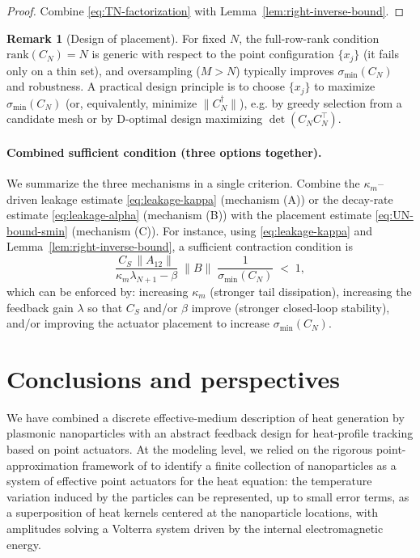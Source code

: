 \documentclass[11pt,a4paper]{article}
\numberwithin{equation}{section}
\theoremstyle{definition}
\newtheorem{remark}[theorem]{Remark}
\newcommand{\1}{\mathbbm{1}}
\begin{document}
\begin{proof}
Combine \eqref{eq:TN-factorization} with Lemma~\ref{lem:right-inverse-bound}.
\end{proof}

\begin{remark}[Design of placement]
For fixed $N$, the full-row-rank condition $\mathrm{rank}(C_N)=N$ is generic with respect to the point configuration
$\{x_j\}$ (it fails only on a thin set), and oversampling ($M>N$) typically improves $\sigma_{\min}(C_N)$ and robustness.
A practical design principle is to choose $\{x_j\}$ to maximize $\sigma_{\min}(C_N)$ (or, equivalently, minimize $\|C_N^\dagger\|$),
e.g. by greedy selection from a candidate mesh or by D-optimal design maximizing $\det(C_NC_N^\top)$.
\end{remark}

\paragraph{Combined sufficient condition (three options together).}
We summarize the three mechanisms in a single criterion. Combine the $\kappa_m$--driven leakage estimate
\eqref{eq:leakage-kappa} (mechanism (A)) or the decay-rate estimate \eqref{eq:leakage-alpha} (mechanism (B))
with the placement estimate \eqref{eq:UN-bound-smin} (mechanism (C)). For instance, using \eqref{eq:leakage-kappa} and
Lemma~\ref{lem:right-inverse-bound}, a sufficient contraction condition is
\[
\frac{C_S\,\|A_{12}\|}{\kappa_m\lambda_{N+1}-\beta}\;\|B\|\;\frac{1}{\sigma_{\min}(C_N)} \;<\; 1,
\]
which can be enforced by: increasing $\kappa_m$ (stronger tail dissipation), increasing the feedback gain $\lambda$ so that
$C_S$ and/or $\beta$ improve (stronger closed-loop stability), and/or improving the actuator placement to increase $\sigma_{\min}(C_N)$.












\section{Conclusions and perspectives}

\noindent We have combined a discrete effective-medium description of heat generation by
plasmonic nanoparticles with an abstract feedback design for heat-profile
tracking based on point actuators. At the modeling level, we relied on the
rigorous point-approximation framework of \cite{CaoMukherjeeSini2025} to
identify a finite collection of nanoparticles as a system of effective point
actuators for the heat equation: the temperature variation induced by the
particles can be represented, up to small error terms, as a superposition of
heat kernels centered at the nanoparticle locations, with amplitudes solving
a Volterra system driven by the internal electromagnetic energy.
\end{document}
